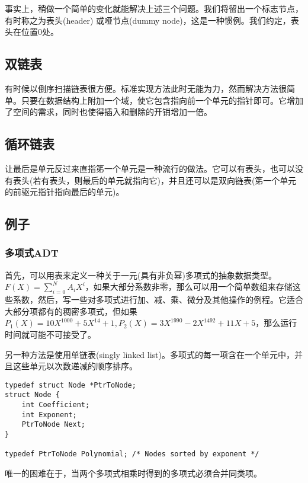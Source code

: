 \documentclass[utf8]{ctexbook}
\begin{document}
事实上，稍做一个简单的变化就能解决上述三个问题。我们将留出一个标志节点，有时称之为{\kaishu 表头(header)} 或{\kaishu 哑节点(dummy node)}，这是一种惯例。我们约定，表头在位置0处。
\subsection{双链表}
有时候以倒序扫描链表很方便。标准实现方法此时无能为力，然而解决方法很简单。只要在数据结构上附加一个域，使它包含指向前一个单元的指针即可。它增加了空间的需求，同时也使得插入和删除的开销增加一倍。
\subsection{循环链表}
让最后是单元反过来直指笫一个单元是一种流行的做法。它可以有表头，也可以没有表头(若有表头，则最后的单元就指向它)，并且还可以是双向链表(笫一个单元的前驱元指针指向最后的单元)。
\subsection{例子}
\subsubsection{多项式ADT}
首先，可以用表来定义一种关于一元(具有非负幂)多项式的抽象数据类型。$\displaystyle F(X) = \sum_{i=0}^{N} A_i X^i$，如果{\kaishu 大部分系数非零}，那么可以用一个简单数组来存储这些系数，然后，写一些对多项式进行加、减、乘、微分及其他操作的例程。它适合大部分项都有的稠密多项式，但如果$P_1(X) = 10 X^{1000} + 5 X^{14} +1, P_2(X) = 3X^{1990} - 2X^{1492} + 11X+5$，那么运行时间就可能不可接受了。

另一种方法是使用单链表(singly linked list)。多项式的每一项含在一个单元中，并且这些单元以次数递减的顺序排序。
\begin{lstlisting}
typedef struct Node *PtrToNode;
struct Node {
    int Coefficient;
    int Exponent;
    PtrToNode Next;
}

typedef PtrToNode Polynomial; /* Nodes sorted by exponent */
\end{lstlisting}

唯一的困难在于，当两个多项式相乘时得到的多项式必须合并同类项。
\end{document}
